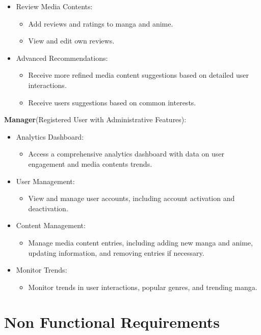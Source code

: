 \begin{itemize}
\begin{itemize}
    \end{itemize}
    \item Review Media Contents:
    \begin{itemize}
        \item Add reviews and ratings to manga and anime.
        \item View and edit own reviews.
    \end{itemize}
    \item Advanced Recommendations:
    \begin{itemize}
        \item Receive more refined media content suggestions based on detailed user interactions.
        \item Receive users suggestions based on common interests.
    \end{itemize}
\end{itemize}

\textbf{Manager}(Registered User with Administrative Features):

\begin{itemize}
    \item Analytics Dashboard:
    \begin{itemize}
        \item Access a comprehensive analytics dashboard with data on user engagement and media contents trends.
    \end{itemize}
    \item User Management:
    \begin{itemize}
        \item View and manage user accounts, including account activation and deactivation.
    \end{itemize}
    \item Content Management:
    \begin{itemize}
        \item Manage media content entries, including adding new manga and anime, updating information, and removing entries if necessary.
    \end{itemize}
    \item Monitor Trends:
    \begin{itemize}
        \item Monitor trends in user interactions, popular genres, and trending manga.
    \end{itemize}
\end{itemize}

\section{Non Functional Requirements}

